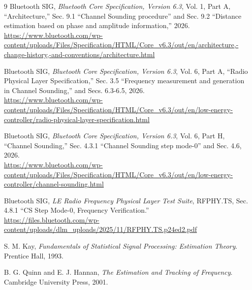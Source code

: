 \documentclass[10pt,a4paper]{article}
\begin{document}
\clearpage
\begin{thebibliography}{9}
Bluetooth SIG, \emph{Bluetooth Core Specification, Version 6.3}, Vol. 1, Part A, ``Architecture,'' Sec. 9.1 ``Channel Sounding procedure'' and Sec. 9.2 ``Distance estimation based on phase and amplitude information,'' 2026.\\
\url{https://www.bluetooth.com/wp-content/uploads/Files/Specification/HTML/Core_v6.3/out/en/architecture,-change-history,-and-conventions/architecture.html}

Bluetooth SIG, \emph{Bluetooth Core Specification, Version 6.3}, Vol. 6, Part A, ``Radio Physical Layer Specification,'' Sec. 3.5 ``Frequency measurement and generation in Channel Sounding,'' and Secs. 6.3-6.5, 2026.\\
\url{https://www.bluetooth.com/wp-content/uploads/Files/Specification/HTML/Core_v6.3/out/en/low-energy-controller/radio-physical-layer-specification.html}

Bluetooth SIG, \emph{Bluetooth Core Specification, Version 6.3}, Vol. 6, Part H, ``Channel Sounding,'' Sec. 4.3.1 ``Channel Sounding step mode-0'' and Sec. 4.6, 2026.\\
\url{https://www.bluetooth.com/wp-content/uploads/Files/Specification/HTML/Core_v6.3/out/en/low-energy-controller/channel-sounding.html}

Bluetooth SIG, \emph{LE Radio Frequency Physical Layer Test Suite}, RFPHY.TS, Sec. 4.8.1 ``CS Step Mode-0, Frequency Verification.''\\
\url{https://files.bluetooth.com/wp-content/uploads/dlm_uploads/2025/11/RFPHY.TS.p24ed2.pdf}

S. M. Kay, \emph{Fundamentals of Statistical Signal Processing: Estimation Theory}. Prentice Hall, 1993.

B. G. Quinn and E. J. Hannan, \emph{The Estimation and Tracking of Frequency}. Cambridge University Press, 2001.
\end{thebibliography}
\end{document}
